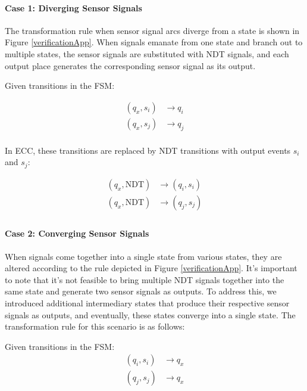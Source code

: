 \documentclass{ieeeojies}
\begin{document}
\paragraph{Case 1: Diverging Sensor Signals }



The transformation rule when sensor signal arcs diverge from a state is shown in Figure \ref{verificationApp}. When signals emanate from one state and branch out to multiple states, the sensor signals are substituted with NDT signals, and each output place generates the corresponding sensor signal as its output.



Given transitions in the FSM:


\[
\begin{aligned}
(q_x, s_i) & \rightarrow q_i \\
(q_x, s_j) & \rightarrow q_j \\
\end{aligned}
\]



In ECC, these transitions are replaced by NDT transitions with output events $s_i$ and $s_j$:



\[
\begin{aligned}
(q_x, \text{NDT}) & \rightarrow (q_i, s_i) \\
(q_x, \text{NDT}) & \rightarrow (q_j, s_j) \\
\end{aligned}
\]


\paragraph{Case 2: Converging Sensor Signals }



When signals come together into a single state from various states, they are altered according to the rule depicted in Figure \ref{verificationApp}. It's important to note that it's not feasible to bring multiple NDT signals together into the same state and generate two sensor signals as outputs. To address this, we introduced additional intermediary states that produce their respective sensor signals as outputs, and eventually, these states converge into a single state. The transformation rule for this scenario is as follows:



Given transitions in the FSM:
\[
\begin{aligned}
(q_i, s_i) & \rightarrow q_x \\
(q_j, s_j) & \rightarrow q_x \\
\end{aligned}
\]
\end{document}
